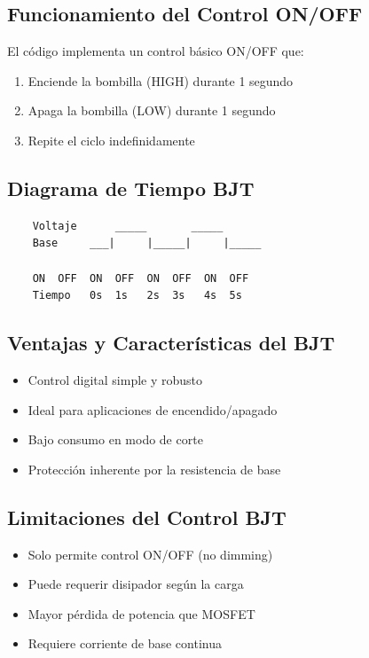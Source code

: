 \subsection{Funcionamiento del Control ON/OFF}
El código implementa un control básico ON/OFF que:
\begin{enumerate}
	\item Enciende la bombilla (HIGH) durante 1 segundo
	\item Apaga la bombilla (LOW) durante 1 segundo
	\item Repite el ciclo indefinidamente
\end{enumerate}

\subsection{Diagrama de Tiempo BJT}
\begin{verbatim}
	Voltaje      _____       _____      
	Base     ___|     |_____|     |_____
	
	ON  OFF  ON  OFF  ON  OFF  ON  OFF
	Tiempo   0s  1s   2s  3s   4s  5s  
\end{verbatim}

\subsection{Ventajas y Características del BJT}
\begin{itemize}
	\item Control digital simple y robusto
	\item Ideal para aplicaciones de encendido/apagado
	\item Bajo consumo en modo de corte
	\item Protección inherente por la resistencia de base
\end{itemize}

\subsection{Limitaciones del Control BJT}
\begin{itemize}
	\item Solo permite control ON/OFF (no dimming)
	\item Puede requerir disipador según la carga
	\item Mayor pérdida de potencia que MOSFET
	\item Requiere corriente de base continua
\end{itemize}

